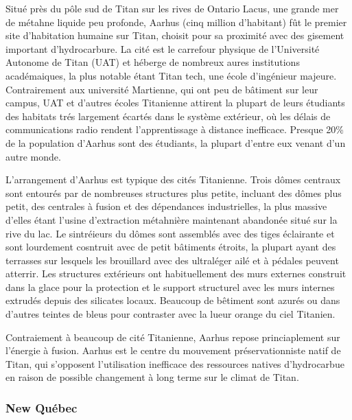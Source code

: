                                                                      Situé près du pôle sud de Titan sur les rives de Ontario Lacus, une grande mer de métahne liquide peu profonde, Aarhus (cinq million d'habitant) fût le premier site d'habitation humaine sur Titan, choisit pour sa proximité avec des gisement important d'hydrocarbure. La cité est le carrefour physique de l'Université Autonome de Titan (UAT) et héberge de nombreux aures institutions académaiques, la plus notable étant Titan tech, une école d'ingénieur majeure. Contrairement aux université Martienne, qui ont peu de bâtiment sur leur campus, UAT et d'autres écoles Titanienne attirent la plupart de leurs étudiants des habitats trés largement écartés dans le système extérieur, où les délais de communications radio rendent l'apprentissage à distance inefficace. Presque 20\% de la population d'Aarhus sont des étudiants, la plupart d'entre eux venant d'un autre monde. 

                                                                     L'arrangement d'Aarhus est typique des cités Titanienne. Trois dômes centraux sont entourés par de nombreuses structures plus petite, incluant des dômes plus petit, des centrales à fusion et des dépendances industrielles, la plus massive d'elles étant l'usine d'extraction métahnière maintenant abandonée situé sur la rive du lac. Le sintréieurs du dômes sont assemblés avec des tiges éclairante et sont lourdement cosntruit avec de petit bâtiments étroits, la plupart ayant des terrasses sur lesquels les brouillard avec des ultraléger ailé et à pédales peuvent atterrir. Les structures extérieurs ont habituellement des murs externes construit dans la glace pour la protection et le support structurel avec les murs internes extrudés depuis des silicates locaux. Beaucoup de bêtiment sont azurés ou dans d'autres teintes de bleus pour contraster avec la lueur orange du ciel Titanien. 

                                                                     Contraiement à beaucoup de cité Titanienne, Aarhus repose princiaplement sur l'énergie à fusion. Aarhus est le centre du mouvement préservationniste natif de Titan, qui s'opposent l'utilisation inefficace des ressources natives d'hydrocarbue en raison de possible changement à long terme sur le climat de Titan. 

                                                                     \subsubsection{New Québec} \label{sec:new-quebec} 

